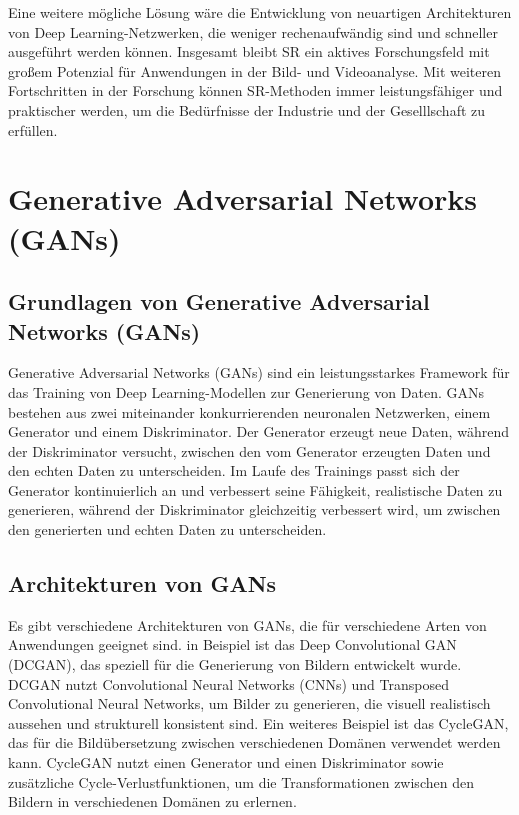         Eine weitere mögliche Lösung wäre die Entwicklung von neuartigen Architekturen von Deep Learning-Netzwerken, die weniger rechenaufwändig sind und schneller ausgeführt werden können.
        Insgesamt bleibt SR ein aktives Forschungsfeld mit großem Potenzial für Anwendungen in der Bild- und Videoanalyse.      
        Mit weiteren Fortschritten in der Forschung können SR-Methoden immer leistungsfähiger und praktischer werden, um die Bedürfnisse der Industrie und der Geselllschaft zu erfüllen.

\section{Generative Adversarial Networks (GANs)}

    \subsection{Grundlagen von Generative Adversarial Networks (GANs)}
        
        Generative Adversarial Networks (GANs) sind ein leistungsstarkes Framework für das Training von Deep Learning-Modellen zur Generierung von Daten.      
        GANs bestehen aus zwei miteinander konkurrierenden neuronalen Netzwerken, einem Generator und einem Diskriminator.      
        Der Generator erzeugt neue Daten, während der Diskriminator versucht, zwischen den vom Generator erzeugten Daten und den echten Daten zu unterscheiden.     Im Laufe des Trainings passt sich der Generator kontinuierlich an und verbessert seine Fähigkeit, realistische Daten zu generieren, während der Diskriminator gleichzeitig verbessert wird, um zwischen den generierten und echten Daten zu unterscheiden.
    
    \subsection{Architekturen von GANs}
    
        Es gibt verschiedene Architekturen von GANs, die für verschiedene Arten von Anwendungen geeignet sind.      
        in Beispiel ist das Deep Convolutional GAN (DCGAN), das speziell für die Generierung von Bildern entwickelt wurde.      %
        DCGAN nutzt Convolutional Neural Networks (CNNs) und Transposed Convolutional Neural Networks, um Bilder zu generieren, die visuell realistisch aussehen und strukturell konsistent sind.
        Ein weiteres Beispiel ist das CycleGAN, das für die Bildübersetzung zwischen verschiedenen Domänen verwendet werden kann.      
        CycleGAN nutzt einen Generator und einen Diskriminator sowie zusätzliche Cycle-Verlustfunktionen, um die Transformationen zwischen den Bildern in verschiedenen Domänen zu erlernen.%
    
